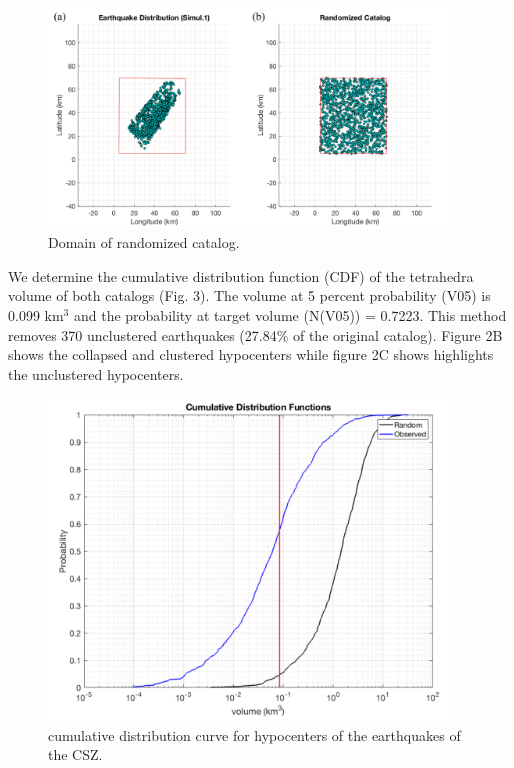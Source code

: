 \documentclass[draft]{agujournal2018}
\begin{document}
\begin{figure}[ht]
\centering
\includegraphics[width=25pc]{Figures/domain_cum_only.png}
\caption{Domain of randomized catalog.}
\label{figfive}
\end{figure}



We determine the cumulative distribution function (CDF) of the tetrahedra volume of both catalogs (Fig. 3). The volume at 5 percent probability (V05) is 0.099 km$^{3}$ and the probability at target volume (N(V05)) = 0.7223. This method removes 370 unclustered earthquakes (27.84\% of the original catalog). Figure 2B shows the collapsed and clustered hypocenters while figure 2C shows highlights the unclustered hypocenters. 

\begin{figure}[ht]
\centering
\includegraphics[width=25pc]{Figures/cdf_cum_only.png}
\caption{cumulative distribution curve for hypocenters of the earthquakes of the CSZ.}
\label{figfive}
\end{figure}
\end{document}
